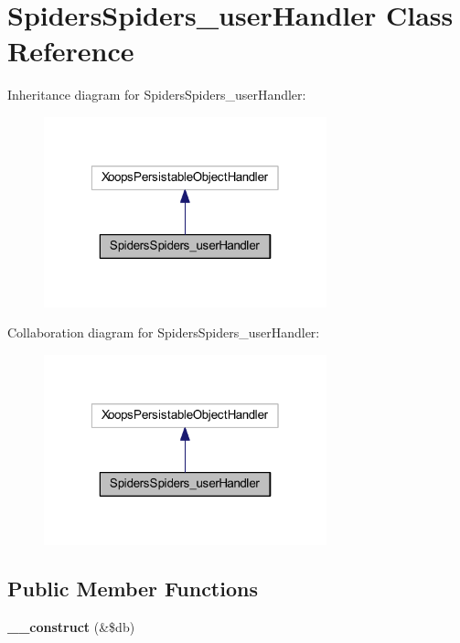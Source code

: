 \hypertarget{class_spiders_spiders__user_handler}{\section{Spiders\-Spiders\-\_\-user\-Handler Class Reference}
\label{class_spiders_spiders__user_handler}
}


Inheritance diagram for Spiders\-Spiders\-\_\-user\-Handler\-:
\nopagebreak
\begin{figure}[H]
\begin{center}
\leavevmode
\includegraphics[width=232pt]{class_spiders_spiders__user_handler__inherit__graph}
\end{center}
\end{figure}


Collaboration diagram for Spiders\-Spiders\-\_\-user\-Handler\-:
\nopagebreak
\begin{figure}[H]
\begin{center}
\leavevmode
\includegraphics[width=232pt]{class_spiders_spiders__user_handler__coll__graph}
\end{center}
\end{figure}
\subsection*{Public Member Functions}
\begin{DoxyCompactItemize}
\item 
\hypertarget{class_spiders_spiders__user_handler_aaf2ef772755ec6f361d44e16cc9ffd69}{{\bfseries \-\_\-\-\_\-construct} (\&\$db)}\label{class_spiders_spiders__user_handler_aaf2ef772755ec6f361d44e16cc9ffd69}

\end{DoxyCompactItemize}


